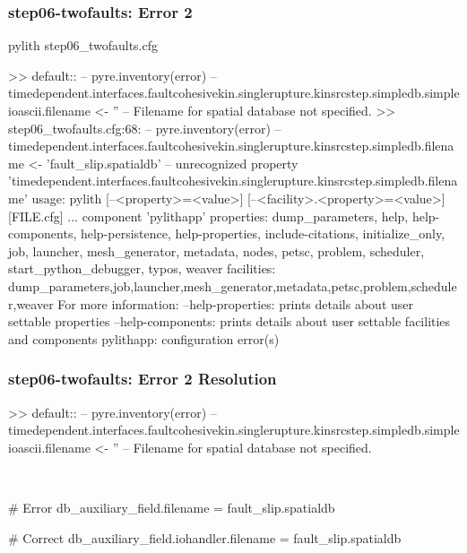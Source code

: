 \documentclass[aspectratio=169]{beamer}
\begin{document}
\begin{frame}[fragile]
  \frametitle{{\ttfamily step06-twofaults}: Error 2}

\begin{bashcode}
pylith step06_twofaults.cfg

 >> {default}::
 -- pyre.inventory(error)
 -- timedependent.interfaces.faultcohesivekin.singlerupture.kinsrcstep.simpledb.simpleioascii.filename <- ''
 -- Filename for spatial database not specified.
 >> step06_twofaults.cfg:68:
 -- pyre.inventory(error)
 -- timedependent.interfaces.faultcohesivekin.singlerupture.kinsrcstep.simpledb.filename <- 'fault_slip.spatialdb'
 -- unrecognized property 'timedependent.interfaces.faultcohesivekin.singlerupture.kinsrcstep.simpledb.filename'
usage: pylith [--<property>=<value>] [--<facility>.<property>=<value>] [FILE.cfg] ...
component 'pylithapp'
    properties: dump_parameters, help, help-components, help-persistence, help-properties, include-citations, initialize_only, job, launcher, mesh_generator, metadata, nodes, petsc, problem, scheduler, start_python_debugger, typos, weaver
    facilities: dump_parameters,job,launcher,mesh_generator,metadata,petsc,problem,scheduler,weaver
For more information:
  --help-properties: prints details about user settable properties
  --help-components: prints details about user settable facilities and components
pylithapp: configuration error(s)
\end{bashcode}

\end{frame}


\begin{frame}[t,fragile]
  \frametitle{{\ttfamily step06-twofaults}: Error 2 Resolution}

  \tserror
  \begin{bashcode}
    >> {default}::
    -- pyre.inventory(error)
    -- timedependent.interfaces.faultcohesivekin.singlerupture.kinsrcstep.simpledb.simpleioascii.filename <- ''
    -- Filename for spatial database not specified.
  \end{bashcode}

  \pause\\[1pt]

  \begin{cfgcode}
    # Error
    db_auxiliary_field.filename = fault_slip.spatialdb

    # Correct
    db_auxiliary_field.iohandler.filename = fault_slip.spatialdb
  \end{cfgcode}

\end{frame}
\end{document}

